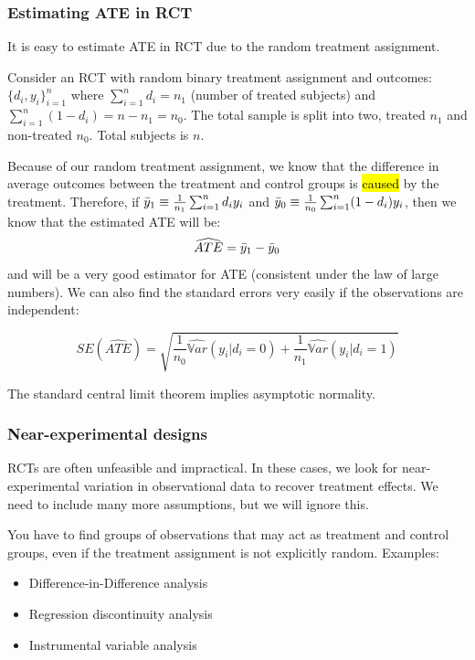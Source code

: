 \documentclass[11pt]{article}
\begin{document}
\subsubsection{Estimating ATE in RCT}

It is easy to estimate ATE in RCT due to the random treatment assignment.

\begin{procedure}
    Consider an RCT with random binary treatment assignment and outcomes: $\{d_i,y_i\}_{i=1}^n$ where $\sum_{i=1}^n d_i = n_1$ (number of treated subjects) and $\sum_{i=1}^n (1-d_i) = n-n_1 = n_0$. The total sample is split into two, treated $n_1$ and non-treated $n_0$. Total subjects is $n$.

    Because of our random treatment assignment, we know that the difference in average outcomes between the treatment and control groups is \hl{caused} by the treatment. Therefore, if $\Bar{y}_1\equiv \frac{1}{n_1}\sum_{i=1}^n d_iy_i$ and $\Bar{y}_0 \equiv \frac{1}{n_0}\sum_{i=1}^n(1-d_i)y_i$, then we know that the estimated ATE will be:
    \begin{equation}
        \widehat{ATE} = \Bar{y}_1 - \Bar{y}_0
    \end{equation}
    and will be a very good estimator for ATE (consistent under the law of large numbers). We can also find the standard errors very easily if the observations are independent:

    \begin{equation*}
        SE(\widehat{ATE}) = \sqrt{\dfrac{1}{n_0}\widehat{\mathbb{V}ar}(y_i|d_i=0) + \dfrac{1}{n_1}\widehat{\mathbb{V}ar}(y_i|d_i=1)}
    \end{equation*}
\end{procedure}

\begin{note}
    The standard central limit theorem implies asymptotic normality.
\end{note}

\subsubsection{Near-experimental designs}
RCTs are often unfeasible and impractical. In these cases, we look for near-experimental variation in observational data to recover treatment effects. We need to include many more assumptions, but we will ignore this. 

You have to find groups of observations that may act as treatment and control groups, even if the treatment assignment is not explicitly random. Examples:
\begin{itemize}
    \item Difference-in-Difference analysis
    \item Regression discontinuity analysis
    \item Instrumental variable analysis
\end{itemize}
\end{document}
